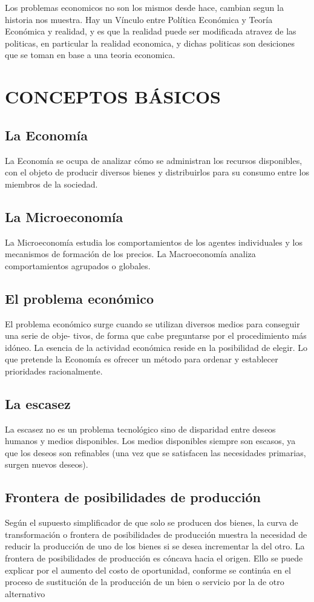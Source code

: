 \documentclass[12pt]{book}
\begin{document}
Los problemas economicos no son los mismos desde hace, cambian segun la historia nos muestra.
Hay un Vínculo entre Política Económica y Teoría Económica y realidad, y es que la realidad puede ser modificada atravez de las politicas, en particular la realidad economica, y dichas politicas son desiciones que se toman en base a una teoria economica.

\chapter{CONCEPTOS BÁSICOS}
\section{La Economía}
La Economía se ocupa de analizar cómo se administran los recursos disponibles, con el objeto de producir diversos bienes y distribuirlos para su consumo entre los miembros de la sociedad.
\section{La Microeconomía}La Microeconomía estudia los comportamientos de los agentes individuales y los mecanismos de
formación de los precios. La Macroeconomía analiza comportamientos agrupados o globales.


\section{El problema económico}El problema económico surge cuando se utilizan diversos medios para conseguir una serie de obje-
tivos, de forma que cabe preguntarse por el procedimiento más idóneo. La esencia de la actividad económica reside en la posibilidad de elegir. Lo que pretende la Economía es ofrecer un método para ordenar y establecer prioridades racionalmente.

\section{La escasez}La escasez no es un problema tecnológico sino de disparidad entre deseos humanos y medios disponibles. Los medios disponibles siempre son escasos, ya que los deseos son refinables (una vez que se satisfacen las necesidades primarias, surgen nuevos deseos).

\section{Frontera de posibilidades de producción}
Según el supuesto simplificador de que solo se producen dos bienes, la curva de transformación o frontera de posibilidades de producción muestra la necesidad de reducir la producción de uno de los bienes si se desea incrementar la del otro.
La frontera de posibilidades de producción es cóncava hacia el origen. Ello se puede explicar por el aumento del costo de oportunidad, conforme se continúa en el proceso de sustitución de la producción de un bien o servicio por la de otro
alternativo
\end{document}
